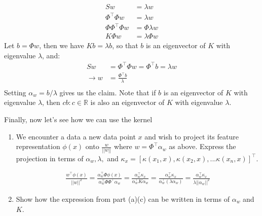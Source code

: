 \begin{Parts}
\begin{enumerate}
\begin{solution}
    \begin{align*}
        Sw &=  \lambda{}w\\
        \Phi^{\top}\Phi{}w &=  \lambda{}w\\
        \Phi\Phi^{\top}\Phi w &= \Phi \lambda{} w \\
        K\Phi w &= \lambda \Phi w 
    \end{align*}
    Let $b = \Phi w$, then we have $Kb = \lambda b$, so that $b$ is an
    eigenvector of $K$ with eigenvalue $\lambda$, and:    
    \begin{align*}
        Sw &= \Phi^{\top}\Phi w = \Phi^{\top} b = \lambda w \\
        \longrightarrow{} w &= \frac{\Phi^{\top} b}{\lambda} \\
    \end{align*}
    Setting $\alpha_w = b / \lambda$ gives us the claim. Note that if $b$ is an
    eigenvector of $K$ with eigenvalue $\lambda$, then $cb : c \in \mathbb{R}$ is also
    an eigenvector of $K$ with eigenvalue $\lambda$.
\end{solution}
    
\end{enumerate}
\item Finally, now let's see how we can use the kernel
\begin{enumerate}
    \item We encounter a data a new data point $x$ and wish to project its
        feature representation $\phi(x)$ onto $\frac{w}{||w||}$ where $w =
        \Phi^{\top} \alpha_w$ as above. Express the projection in terms of
        $\alpha_w, \lambda,$ and $\kappa_x = [\kappa(x_1, x), \kappa(x_2, x),
        ... \kappa(x_n, x)]^{\top}$. 
    
    \begin{solution}
    \begin{align*}
        \frac{w^{\top}\phi(x)}{||w||^2} =
        \frac{\alpha_{w}^{\top}\Phi\phi(x)}{\alpha_{w}^{\top}\Phi\Phi^{\top}\alpha_w} =
        \frac{\alpha_{w}^{\top}\kappa_x}{\alpha_{w}^{\top}K\alpha_w} =
        \frac{\alpha_{w}^{\top}\kappa_x}{\alpha_{w}^{\top}\left(\lambda\alpha_w\right)} =
    \frac{\alpha_{w}^{\top}\kappa_x}{\lambda||\alpha_w||^2}
    \end{align*}
\end{solution}
    
    \item Show how the expression from part (a)(c) can be written in terms of $\alpha_w$ and $K$.
    

\end{enumerate}
\end{Parts}
